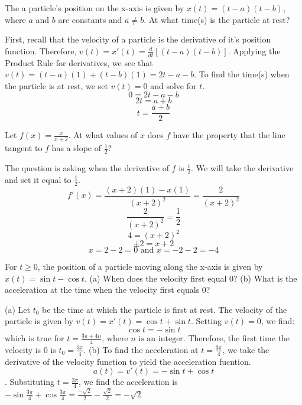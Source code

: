 \begin{Exercise}
    [label=deriv_rules5]
    The a particle's position on the x-axis is given by $x(t)=(t-a)(t-b)$, where $a$ and $b$ are constants and $a \neq b$. At what time(s) is the particle at rest?
\end{Exercise}
\begin{Answer}
    [ref=deriv_rules5]
    First, recall that the velocity of a particle is the derivative of it's position function. Therefore, $v(t) = x'(t) = \frac{d}{dt}[(t-a)(t-b)]$. Applying the Product Rule for derivatives, we see that $v(t) = (t-a)(1) + (t-b)(1) = 2t-a-b$. To find the time(s) when the particle is at rest, we set $v(t) = 0$ and solve for $t$. $$0 = 2t-a-b$$ $$2t=a+b$$ $$t=\frac{a+b}{2}$$
\end{Answer}

\begin{Exercise}
    [label = deriv_rules6]
    Let $f(x) = \frac{x}{x+2}$. At what values of $x$ does $f$ have the property that the line tangent to $f$ has a slope of $\frac{1}{2}$?
\end{Exercise}
\begin{Answer}
    [ref=deriv_rules6]
    The question is asking when the derivative of $f$ is $\frac{1}{2}$. We will take the derivative and set it equal to $\frac{1}{2}$. $$f'(x) = \frac{(x+2)(1)-x(1)}{(x+2)^2}=\frac{2}{(x+2)^2}$$
    $$\frac{2}{(x+2)^2}=\frac{1}{2}$$
    $$4=(x+2)^2$$
    $$\pm 2 = x+2$$
    $$x=2-2=0 \text{ and } x=-2-2=-4$$
\end{Answer}

\begin{Exercise}
    [label=deriv_rules7]
    For $t \geq 0$, the position of a particle moving along the x-axis is given by $x(t) = \sin{t} - \cos{t}$. (a) When does the velocity first equal $0$? (b) What is the acceleration at the time when the velocity first equals $0$?
\end{Exercise}
\begin{Answer}
    [ref=deriv_rules7]
    (a) Let $t_0$ be the time at which the particle is first at rest. The velocity of the particle is given by $v(t) = x'(t) = \cos{t} +\sin{t}$. Setting $v(t) = 0$, we find:
    $$\cos{t} = -\sin{t}$$ which is true for $t=\frac{3\pi+4n}{4}\text{, where $n$ is an integer.}$ Therefore, the first time the velocity is $0$ is $t_0 = \frac{3\pi}{4}$. (b) To find the acceleration at $t=\frac{3\pi}{4}$, we take the derivative of the velocity function to yield the acceleration fucntion. $$a(t) = v'(t) = -\sin{t} + \cos{t}$$. Substituting $t=\frac{3\pi}{4}$, we find the acceleration is $-\sin{\frac{3\pi}{4}} + \cos{\frac{3\pi}{4}} = \frac{-\sqrt{2}}{2} - \frac{\sqrt{2}}{2} = -\sqrt{2}$
\end{Answer}

